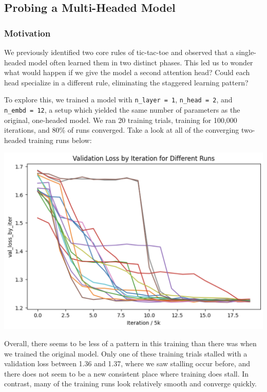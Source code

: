 \documentclass[11pt]{article}
\begin{document}
    \subsection{Probing a Multi-Headed
Model}\label{probing-a-multi-headed-model}

\subsubsection{Motivation}\label{motivation}

We previously identified two core rules of tic-tac-toe and observed that
a single-headed model often learned them in two distinct phases. This
led us to wonder what would happen if we give the model a second
attention head? Could each head specialize in a different rule,
eliminating the staggered learning pattern?

To explore this, we trained a model with \texttt{n\_layer\ =\ 1},
\texttt{n\_head\ =\ 2}, and \texttt{n\_embd\ =\ 12}, a setup which
yielded the same number of parameters as the original, one-headed model.
We ran 20 training trials, training for 100,000 iterations, and 80\% of
runs converged. Take a look at all of the converging two-headed training
runs below:

\begin{center}
\includegraphics[keepaspectratio]{inserted_images/converging_2_heads.png}
\end{center}

Overall, there seems to be less of a pattern in this training than there
was when we trained the original model. Only one of these training
trials stalled with a validation loss between 1.36 and 1.37, where we
saw stalling occur before, and there does not seem to be a new
consistent place where training does stall. In contrast, many of the
training runs look relatively smooth and converge quickly.
\end{document}
